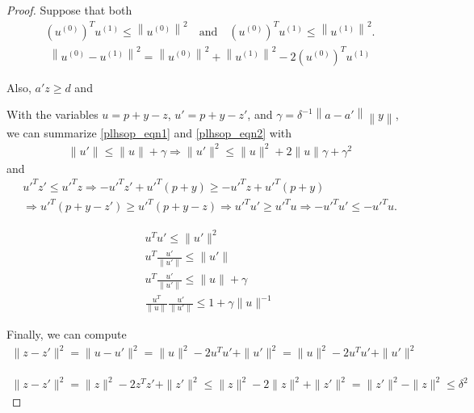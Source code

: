 \documentclass{article}
\theoremstyle{case}
\numberwithin{theorem}{subsection}
\begin{document}
\begin{proof}
Suppose that both
\begin{align*}
\left(u^{(0)}\right)^Tu^{(1)} \le \left \| u^{(0)} \right \|^2 			\quad \textrm{and} \quad
\left(u^{(0)}\right)^Tu^{(1)} \le \left \| u^{(1)} \right \|^2.
\end{align*}
\begin{align*}
\left\|u^{(0)} - u^{(1)}\right\|^2 =  \left \| u^{(0)} \right \|^2 + \left \| u^{(1)} \right \|^2 - 2 \left(u^{(0)}\right)^Tu^{(1)}
\end{align*}

Also, $a' z \ge d$ and 



With the variables $u = p + y - z$, $u' = p + y - z'$, and $\gamma = \delta^{-1}\left\|a - a'\right\|\left\|y\right\|$, we can summarize \cref{plhsop_eqn1} and \cref{plhsop_eqn2}
with 
\begin{align*}
\|u'\| \le \|u\| + \gamma
\Longrightarrow \|u'\|^2 \le \|u\|^2 + 2\|u\| \gamma + \gamma^2
\end{align*}
and
\begin{align*}
{u'}^Tz' \le {u'}^T z
\Longrightarrow -{u'}^Tz' + {u'}^T\left(p + y\right) 
\ge -{u'}^T z + {u'}^T \left(p + y\right) \\
\Longrightarrow {u'}^T\left(p + y - z'\right) \ge {u'}^T \left(p + y - z\right)
\Longrightarrow {u'}^Tu' \ge {u'}^T u
\Longrightarrow -{u'}^Tu' \le -{u'}^T u.
\end{align*}


\begin{align*}
u^Tu' \le \|u'\|^2 \\
u^T\frac{u'}{\|u'\|} \le \|u'\| \\
u^T\frac{u'}{\|u'\|} \le \|u\| + \gamma \\
\frac{u^T}{\|u\|}\frac{u'}{\|u'\|} \le 1 + \gamma\|u\|^{-1}
\end{align*}


Finally, we can compute
\begin{align*}
\|z - z'\|^2 
= \|u - u'\|^2 
= \|u\|^2 - 2u^Tu' + \|u'\|^2
= \|u\|^2 - 2u^Tu' + \|u'\|^2
\end{align*}


\begin{align*}
\|z - z'\|^2 
= \|z\|^2 - 2 z^Tz' + \|z'\|^2 
\le \|z\|^2 - 2 \|z\|^2 + \|z'\|^2 = \|z'\|^2 - \|z\|^2
\le \delta^2
\end{align*}



\end{proof}
\end{document}
